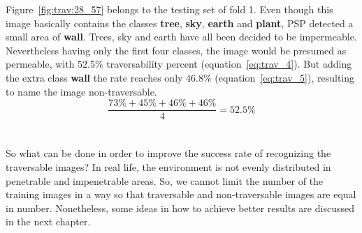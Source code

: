 \documentclass[12pt,a4paper,table,dvipsnames,tikz]{report}
\newcommand{\acronym}{\MakeUppercase}
\newcommand{\bl}[1]{{\hypersetup{linkcolor=blue}#1}}
\newcommand{\class}[1]{\textbf{\textcolor{#1}{#1}}} %
\begin{document}
	Figure~\bl{\ref{fig:trav:28_57}} belongs to the testing set of fold 1. Even though 
	this image basically contains the classes \class{tree}, \class{sky}, \class{earth} 
	and \class{plant}, \acronym{psp} detected a small area of \class{wall}. Trees, sky 
	and earth have all been decided to be impermeable. Nevertheless having only the first 
	four classes, the image would be presumed as permeable, with 52.5\% traversability 
	percent (equation~\bl{\ref{eq:trav_4}}). But adding the extra class \class{wall} the 
	rate reaches only 46.8\% (equation~\bl{\ref{eq:trav_5}}), resulting to name the image 
	non-traversable.
	\begin{equation} \label{eq:trav_4}
	\frac{73\% + 45\% + 46\% + 46\%}{4} = 52.5\%
	\end{equation}
	\\\\
	
	So what can be done in order to improve the success rate of recognizing the traversable 
	images? In real life, the environment is not evenly distributed in penetrable and 
	impenetrable areas. So, we cannot limit the number of the training images in a way 
	so that traversable and non-traversable images are equal in number. Nonetheless, some 
	ideas in how to achieve better results are discussed in the next chapter. 
	\\
	
\end{document}
